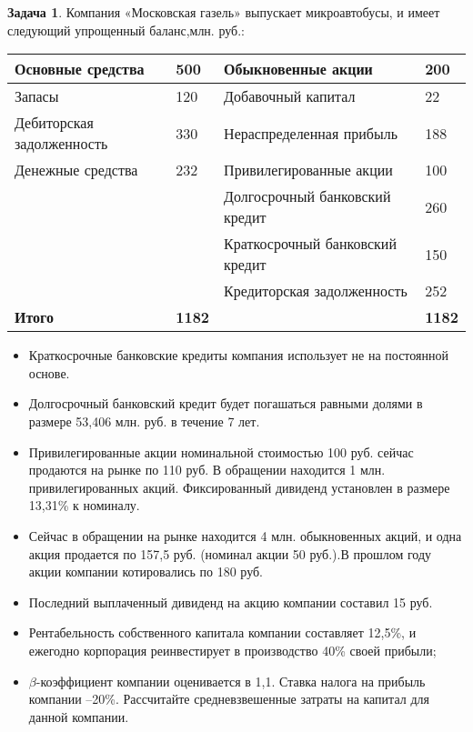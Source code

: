 \documentclass[a4paper, 14pt]{article}
\theoremstyle{plain} %
\theoremstyle{definition} %
\newtheorem{problem}{Задача}[subsection]
\theoremstyle{remark} %
\begin{document}
\begin{problem}
	Компания «Московская газель» выпускает микроавтобусы, и имеет следующий упрощенный баланс,млн. руб.:

\begin{center}
\begin{tabular}{|l|l|l|l|}
\hline
Основные средства         & 500 & Обыкновенные акции              & 200   \\
\hline
Запасы                    & 120  & Добавочный капитал              & 22    \\
\hline
Дебиторская задолженность & 330  & Нераспределенная прибыль        & 188   \\
\hline
Денежные средства         & 232  & Привилегированные акции                       & 100   \\
\hline
                          &      & Долгосрочный банковский кредит  & 260   \\
\hline
                          &      & Краткосрочный банковский кредит & 150   \\
\hline
                          &      & Кредиторская задолженность      & 252   \\
\hline
\textbf{Итого}                     & \textbf{1182} &                                 & \textbf{1182}  \\
\hline
\end{tabular}
\end{center}
\begin{itemize}
	\item Краткосрочные банковские кредиты компания использует не на постоянной основе.
	\item Долгосрочный банковский кредит будет погашаться равными долями в размере 53,406 млн. руб. в течение 7 лет.
	\item Привилегированные акции номинальной стоимостью 100 руб. сейчас продаются на рынке по 110 руб. В обращении находится 1 млн. привилегированных акций. Фиксированный дивиденд установлен в размере 13,31\% к номиналу.
	\item Сейчас в обращении на рынке находится 4 млн. обыкновенных акций, и одна акция продается по 157,5 руб. (номинал акции 50 руб.).В прошлом году акции компании котировались по 180 руб.
	\item Последний выплаченный дивиденд на акцию компании составил 15 руб.
	\item Рентабельность собственного капитала компании составляет 12,5\%, и ежегодно корпорация реинвестирует в производство 40\% своей прибыли;
	\item $\beta$-коэффициент компании оценивается в 1,1. Ставка налога на прибыль компании –20\%. Рассчитайте средневзвешенные затраты на капитал для данной компании.

\end{itemize}
\end{problem}
\end{document}
